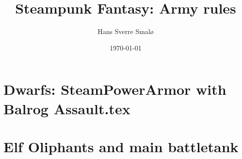 \documentclass[a4,12pt, color, hyperref]{book}
\title{Steampunk Fantasy: Army rules}
\author{Hans Sverre Smalø}
\date{\today}
\begin{document}
\maketitle
\setcounter{tocdepth}{1}
\tableofcontents

%

\chapter{Dwarfs: SteamPowerArmor with Balrog Assault.tex}


\chapter{Elf Oliphants and main battletank}

\end{document}

